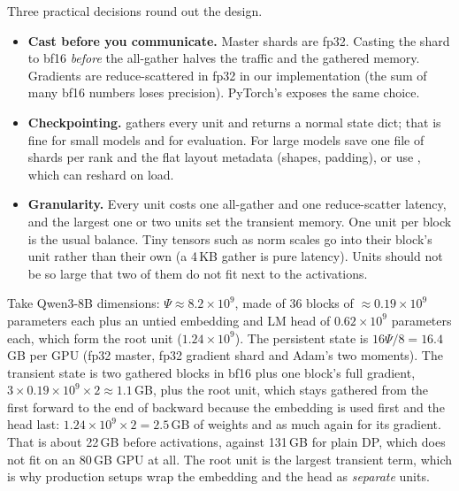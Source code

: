 Three practical decisions round out the design.

\begin{itemize}
  \item \textbf{Cast before you communicate.} Master shards are fp32. Casting the shard to bf16
    \emph{before} the all-gather halves the traffic and the gathered memory. Gradients are
    reduce-scattered in fp32 in our implementation (the sum of many bf16 numbers loses precision).
    PyTorch's  exposes the same choice.
  \item \textbf{Checkpointing.}  gathers every unit and returns a normal state
    dict; that is fine for small models and for evaluation. For large models save one file of shards
    per rank and the flat layout metadata (shapes, padding), or use
    , which can reshard on load.
  \item \textbf{Granularity.} Every unit costs one all-gather and one reduce-scatter latency, and
    the largest one or two units set the transient memory. One unit per block is the usual balance.
    Tiny tensors such as norm scales go into their block's unit rather than their own (a 4\,KB
    gather is pure latency). Units should not be so large that two of them do not fit next to the
    activations.
\end{itemize}

\begin{napkinmath}
Take Qwen3-8B dimensions: $\Psi\approx8.2\times10^9$, made of 36 blocks of
$\approx0.19\times10^9$ parameters each plus an untied embedding and LM head of
$0.62\times10^9$ parameters each, which form the root unit ($1.24\times10^9$). The persistent
state is $16\Psi/8 = 16.4$\,GB per GPU (fp32 master, fp32 gradient shard and Adam's two moments).
The transient state is two gathered blocks in bf16 plus one block's full gradient,
$3\times0.19\times10^9\times2 \approx 1.1$\,GB, plus the root unit, which stays gathered from the
first forward to the end of backward because the embedding is used first and the head last:
$1.24\times10^9\times2 = 2.5$\,GB of weights and as much again for its gradient. That is about
22\,GB before activations, against 131\,GB for plain DP, which does not fit on an 80\,GB GPU at all.
The root unit is the largest transient term, which is why production setups wrap the embedding
and the head as \emph{separate} units.
\end{napkinmath}

